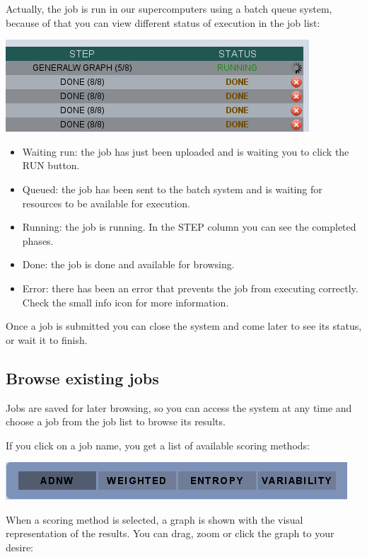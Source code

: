 \documentclass[12pt,oneside,a4paper,english]{article}  %
\begin{document}
Actually, the job is run in our supercomputers using a batch queue system, because of that you can view different status of execution in the job list:

\begin{center}
		\includegraphics[width=.6\linewidth]{pics/run.jpg}
\end{center}

\begin{itemize}
\item Waiting run: the job has just been uploaded and is waiting you to click the RUN button.
\item Queued: the job has been sent to the batch system and is waiting for resources to be available for execution.
\item Running: the job is running. In the STEP column you can see the completed phases.
\item Done: the job is done and available for browsing.
\item Error: there has been an error that prevents the job from executing correctly. Check the small info icon for more information.
\end{itemize}

Once a job is submitted you can close the system and come later to see its status, or wait it to finish.

\subsection{Browse existing jobs}

Jobs are saved for later browsing, so you can access the system at any time and choose a job from the job list to browse its results.

If you click on a job name, you get a list of available scoring methods:

\begin{center}
		\includegraphics[width=.8\linewidth]{pics/methods.jpg}
\end{center}
		
When a scoring method is selected, a graph is shown with the visual representation of the results. You can drag, zoom or click the graph to your desire:
\end{document}
